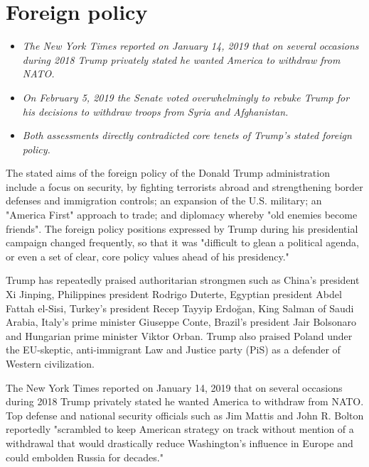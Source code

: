 \section{Foreign policy}\label{foreign-policy}

\begin{itemize}
\item
  \emph{The New York Times reported on January 14, 2019 that on several
  occasions during 2018 Trump privately stated he wanted America to
  withdraw from NATO.}
\item
  \emph{On February 5, 2019 the Senate voted overwhelmingly to rebuke
  Trump for his decisions to withdraw troops from Syria and
  Afghanistan.}
\item
  \emph{Both assessments directly contradicted core tenets of Trump's
  stated foreign policy.}
\end{itemize}

The stated aims of the foreign policy of the Donald Trump administration
include a focus on security, by fighting terrorists abroad and
strengthening border defenses and immigration controls; an expansion of
the U.S. military; an "America First" approach to trade; and diplomacy
whereby "old enemies become friends". The foreign policy positions
expressed by Trump during his presidential campaign changed frequently,
so that it was "difficult to glean a political agenda, or even a set of
clear, core policy values ahead of his presidency."

Trump has repeatedly praised authoritarian strongmen such as China's
president Xi Jinping, Philippines president Rodrigo Duterte, Egyptian
president Abdel Fattah el-Sisi, Turkey's president Recep Tayyip Erdoğan,
King Salman of Saudi Arabia, Italy's prime minister Giuseppe Conte,
Brazil's president Jair Bolsonaro and Hungarian prime minister Viktor
Orban. Trump also praised Poland under the EU-skeptic, anti-immigrant
Law and Justice party (PiS) as a defender of Western civilization.

The New York Times reported on January 14, 2019 that on several
occasions during 2018 Trump privately stated he wanted America to
withdraw from NATO. Top defense and national security officials such as
Jim Mattis and John R. Bolton reportedly "scrambled to keep American
strategy on track without mention of a withdrawal that would drastically
reduce Washington's influence in Europe and could embolden Russia for
decades."

